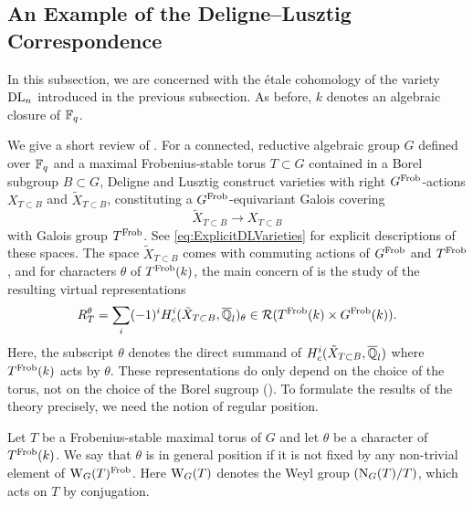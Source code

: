 \documentclass[../main.tex]{subfiles}
\begin{document}

\subsection{An Example of the Deligne--Lusztig Correspondence} %
\label{sub:The Deligne--Lusztig Correspondence for the Explicit Example}

In this subsection, we are concerned with the \'etale cohomology of the variety
$\mathrm{DL}_n$ introduced in the previous subsection. As before, $k$ denotes an algebraic
closure of $\mathbb{F}_q$.

We give a short review of \cite{delignelusztig1976}.
For a connected, reductive algebraic group $G$ defined over $\mathbb{F}_q$ and a maximal
Frobenius-stable torus $T \subset G$ contained in a Borel subgroup $B
\subset G$, Deligne and Lusztig construct varieties with right $G^{\mathrm{Frob}}$-actions
$X_{T\subset B}$ and $\tilde X_{T \subset B}$, constituting a $G^{\mathrm{Frob}}$-equivariant
Galois covering
\begin{equation*}
  \tilde X_{T \subset B} \to X_{T \subset B}
\end{equation*}
with Galois group $T^{\mathrm{Frob}}$. See \eqref{eq:ExplicitDLVarieties} for explicit
descriptions of these spaces. The space $\tilde X_{T \subset B}$ comes with
commuting actions of $G^{\mathrm{Frob}}$ and $T^{\mathrm{Frob}}$, and for characters $\theta$ of $T^{\mathrm{Frob}}(k)$,
the main concern of \cite{delignelusztig1976} is the study of the resulting
virtual representations
\begin{equation} \label{eq:DLRepresentation}
  R_{T}^\theta = \sum_{i} (-1)^i H_c^i(\tilde X_{T \subset B}, \overline
  {\mathbb{Q}}_l)_\theta \in \mathcal{R}(T^{\mathrm{Frob}}(k) \times G^{\mathrm{Frob}}(k)).
\end{equation}
Here, the subscript $\theta$ denotes the direct summand of $H^i_c(\tilde X_{T
\subset B}, \overline {\mathbb{Q}}_l)$ where $T^{\mathrm{Frob}}(k)$ acts by $\theta$.
These representations do only depend on the choice of the torus, not on the
choice of the Borel sugroup
(\cite[Corollary 4.3]{delignelusztig1976}). To formulate the results of the theory 
precisely, we need the notion of regular position.

\begin{defi}\label{def:DLGeomConjRegularPos}
  Let $T$ be a Frobenius-stable maximal  torus of $G$ and let $\theta$ be a character
  of $T^{\mathrm{Frob}}(k)$. We say that $\theta$ is in general position if it is not fixed by any
  non-trivial element of $\mathrm W_G(T)^{\mathrm{Frob}}$. Here $\mathrm W_G(T)$ denotes the Weyl
  group $(\mathrm{N}_G(T)/T)$, which acts on $T$ by conjugation.
\end{defi}
\end{document}
